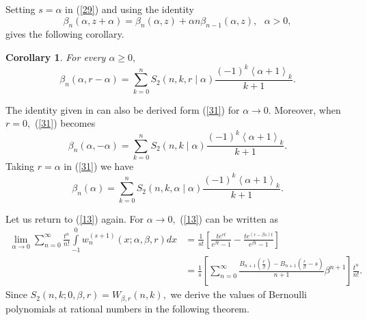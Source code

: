 \documentclass{article}%
\newtheorem{corollary}[theorem]{Corollary}
\begin{document}
Setting $s=\alpha$ in (\ref{29}) and using the identity \cite[Eq.
(5.10)]{Carlitz}%
\[
\beta_{n}\left(  \alpha,z+\alpha\right)  =\beta_{n}\left(  \alpha,z\right)
+\alpha n\beta_{n-1}\left(  \alpha,z\right)  ,\text{ \ }\alpha>0,
\]
gives the following corollary.

\begin{corollary}
For every $\alpha\geq0,$%
\begin{equation}
\beta_{n}\left(  \alpha,r-\alpha\right)  =\sum_{k=0}^{n}S_{2}\left(
n,k,r\mid\alpha\right)  \frac{\left(  -1\right)  ^{k}\left\langle
\alpha+1\right\rangle _{k}}{k+1}. \label{31}%
\end{equation}

\end{corollary}

The identity given in \cite{Mihioubi2} can also be derived form (\ref{31}) for
$\alpha\rightarrow0.$ Moreover, when $r=0,$ (\ref{31}) becomes
\begin{equation}
\beta_{n}\left(  \alpha,-\alpha\right)  =\sum_{k=0}^{n}S_{2}\left(
n,k\mid\alpha\right)  \frac{\left(  -1\right)  ^{k}\left\langle \alpha
+1\right\rangle _{k}}{k+1}. \label{32}%
\end{equation}
Taking $r=\alpha$ in (\ref{31}) we have
\begin{equation}
\beta_{n}\left(  \alpha\right)  =\sum_{k=0}^{n}S_{2}\left(  n,k,\alpha
\mid\alpha\right)  \frac{\left(  -1\right)  ^{k}\left\langle \alpha
+1\right\rangle _{k}}{k+1}. \label{33}%
\end{equation}


Let us return to (\ref{13}) again. For $\alpha\rightarrow0,$ (\ref{13}) can be
written as%
\begin{align*}
\underset{\alpha\rightarrow0}{\lim}\sum_{n=0}^{\infty}\frac{t^{n}}{n!}%
{\displaystyle\int\limits_{-1}^{0}}
w_{n}^{\left(  s+1\right)  }\left(  x;\alpha,\beta,r\right)  dx  &  =\frac
{1}{st}\left[  \frac{te^{rt}}{e^{\beta t}-1}-\frac{te^{\left(  r-\beta
s\right)  t}}{e^{\beta t}-1}\right] \\
&  =\frac{1}{s}\left[  \sum_{n=0}^{\infty}\frac{B_{n+1}\left(  \frac{r}{\beta
}\right)  -B_{n+1}\left(  \frac{r}{\beta}-s\right)  }{n+1}\beta^{n+1}\right]
\frac{t^{n}}{n!}.
\end{align*}
Since $S_{2}\left(  n,k;0,\beta,r\right)  =W_{\beta,r}\left(  n,k\right)  ,$
we derive the values of Bernoulli polynomials at rational numbers in the
following theorem.
\end{document}
